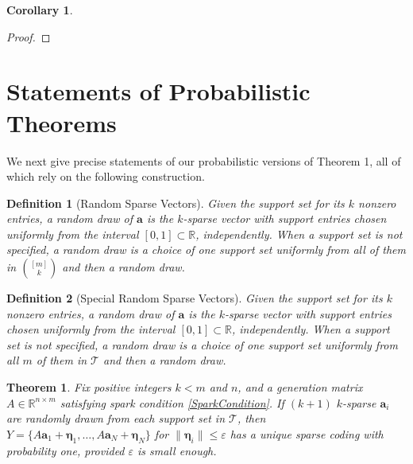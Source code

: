 \documentclass[journal, onecolumn]{IEEEtran}
\newtheorem{theorem}{Theorem}
\newtheorem{definition}{Definition}
\newtheorem{corollary}{Corollary}
\begin{document}
\begin{corollary}

\end{corollary}

\begin{proof}

\end{proof}


\section{Statements of Probabilistic Theorems}\label{PUT}

We next give precise statements of our probabilistic versions of Theorem 1, all of which rely on the following construction.

\begin{definition}[Random Sparse Vectors]\label{RandomDraw}
Given the support set for its $k$ nonzero entries, a random draw of $\mathbf{a}$ is the $k$-sparse vector with support entries chosen uniformly from the interval $[0, 1] \subset \mathbb{R}$, independently. When a support set is not specified, a random draw is a choice of one support set uniformly from all of them in ${[m] \choose k}$ and then a random draw.
\end{definition}

\begin{definition}[Special Random Sparse Vectors]\label{SpecialRandomDraw}
Given the support set for its $k$ nonzero entries, a random draw of $\mathbf{a}$ is the $k$-sparse vector with support entries chosen uniformly from the interval $[0, 1] \subset \mathbb{R}$, independently. When a support set is not specified, a random draw is a choice of one support set uniformly from all $m$ of them in $\mathcal{T}$ and then a random draw.
\end{definition}

\begin{theorem}\label{Theorem2}
Fix positive integers $k < m$ and $n$, and a generation matrix $A \in \mathbb{R}^{n \times m}$ satisfying spark condition \eqref{SparkCondition}. If $(k+1)$ $k$-sparse $\mathbf{a}_i$ are randomly drawn from each support set in $\mathcal{T}$, then $Y = \{A\mathbf{a}_1 + \mathbf{\eta}_1, \ldots ,  A\mathbf{a}_N + \mathbf{\eta}_N \}$ for $\|\mathbf{\eta}_i\| \leq \varepsilon$ has a unique sparse coding with probability one, provided $\varepsilon$ is small enough.
\end{theorem}
\end{document}
